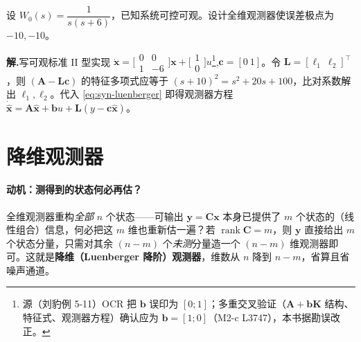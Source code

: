 \begin{example}[全维观测器设计]
\label{ex:syn-observer}
设 $W_0(s)=\dfrac{1}{s(s+6)}$，已知系统可控可观。设计全维观测器使误差极点为 $-10,-10$\cite{liubao2006modern}。

\textbf{解.}\;写可观标准 II 型实现 $\dot{\mathbf x}=\big[\begin{smallmatrix}0&0\\1&-6\end{smallmatrix}\big]\mathbf x+\big[\begin{smallmatrix}1\\0\end{smallmatrix}\big]u$\footnote{源（刘豹例 5-11）OCR 把 $\mathbf b$ 误印为 $[0;1]$；多重交叉验证（$\mathbf A+\mathbf b\mathbf K$ 结构、特征式、观测器方程）确认应为 $\mathbf b=[1;0]$（M2-c L3747），本书据勘误改正。},$\mathbf c=[0\ 1]$。令 $\mathbf L=[\ell_1\ \ell_2]^\top$，则 $(\mathbf A-\mathbf L\mathbf c)$ 的特征多项式应等于 $(s+10)^2=s^2+20s+100$，比对系数解出 $\ell_1,\ell_2$。代入 \cref{eq:syn-luenberger} 即得观测器方程 $\dot{\hat{\mathbf x}}=\mathbf A\hat{\mathbf x}+\mathbf b u+\mathbf L(y-\mathbf c\hat{\mathbf x})$。
\end{example}

\section{降维观测器}
\label{sec:syn-reduced}

\paragraph{动机：测得到的状态何必再估？}
全维观测器重构\emph{全部} $n$ 个状态——可输出 $\mathbf y=\mathbf C\mathbf x$ 本身已提供了 $m$ 个状态的（线性组合）信息，何必把这 $m$ 维也重新估一遍？若 $\operatorname{rank}\mathbf C=m$，则 $\mathbf y$ 直接给出 $m$ 个状态分量，只需对其余 $(n-m)$ 个\emph{未测}分量造一个 $(n-m)$ 维观测器即可。这就是\textbf{降维（Luenberger 降阶）观测器}，维数从 $n$ 降到 $n-m$，省算且省噪声通道\cite{liubao2006modern,zhang2017modern}。

